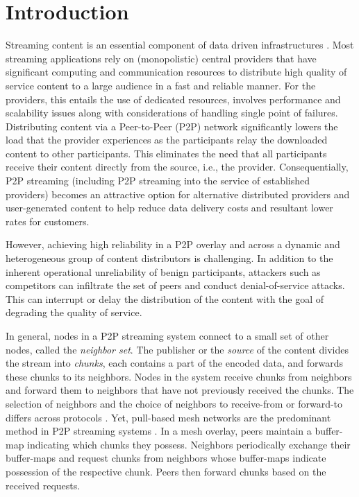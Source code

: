 \section{Introduction}
\label{sec:intro}

Streaming content is an essential component of data driven infrastructures \cite{emule}.
Most streaming applications rely on (monopolistic) central providers that have significant computing and communication resources to distribute high quality of service content to a large audience in a fast and reliable manner. For the providers, this entails the use of dedicated resources, involves performance and scalability issues along with considerations of handling single point of failures.
Distributing content via a Peer-to-Peer (P2P) network significantly lowers the load that the provider experiences as the participants relay the downloaded content to other participants. This eliminates the need that all participants receive their content directly from the source, i.e., the provider. 
Consequentially, P2P streaming (including P2P streaming into the service of established providers) becomes an attractive option for alternative distributed providers and user-generated content to help reduce data delivery costs and resultant lower rates for customers.


However, achieving high reliability in a P2P overlay and across a dynamic and heterogeneous group of content distributors is challenging. In addition to the inherent operational unreliability of benign participants, attackers such as competitors can infiltrate the set of peers and conduct denial-of-service attacks. This can interrupt or delay the distribution of the content with the goal of degrading the quality of service. 

In general, nodes in a P2P streaming system connect to a small set of other nodes, called the \emph{neighbor set}. 
The publisher or the \emph{source} of the content divides the stream into \emph{chunks}, each contains a part of the encoded data, and forwards these chunks to its neighbors. Nodes in the system receive chunks from neighbors and forward them to neighbors that have not previously received the chunks. 
The selection of neighbors and the choice of neighbors to receive-from or forward-to differs across protocols \cite{sasi2014survey}.  Yet, pull-based mesh networks are the predominant method in P2P streaming systems \cite{zhang2014modeling}. In a mesh overlay, peers maintain a buffer-map indicating which chunks they possess.  Neighbors periodically exchange their buffer-maps and request chunks from neighbors whose buffer-maps indicate possession of the respective chunk. Peers then forward chunks based on the received requests. 


